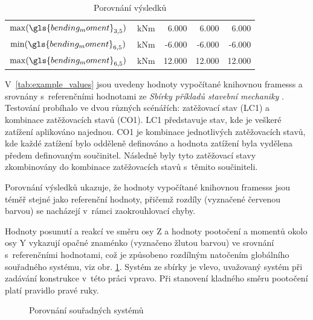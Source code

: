 \begin{table}[H]
\begin{tabular}{ccrrr}
            $\max(\gls{bending_moment}_{3,5})$ & $\SI{}{\kilo\newton\meter}$ & 6.000 & 6.000 & 6.000 \\
            $\min(\gls{bending_moment}_{6,5})$ & $\SI{}{\kilo\newton\meter}$ & -6.000 & -6.000 & -6.000 \\
            $\max(\gls{bending_moment}_{6,5})$ & $\SI{}{\kilo\newton\meter}$ & 12.000 & 12.000 & 12.000 
    \end{tabular}
    \caption{Porovnání výsledků}
    \label{tab:example_values}
\end{table}

V~\autoref{tab:example_values} jsou uvedeny hodnoty vypočítané knihovnou framesss a srovnány s~referenčními hodnotami ze \textit{Sbírky příkladů stavební mechaniky} \cite{sbirka_prikladu}. Testování probíhalo ve dvou různých scénářích: zatěžovací stav (LC1) a kombinace zatěžovacích stavů (CO1). LC1 představuje stav, kde je veškeré zatížení aplikováno najednou. CO1 je kombinace jednotlivých zatěžovacích stavů, kde každé zatížení bylo odděleně definováno a hodnota zatížení byla vydělena předem definovaným součinitel. Následně byly tyto zatěžovací stavy zkombinovány do kombinace zatěžovacích stavů s~těmito součiniteli.

Porovnání výsledků ukazuje, že hodnoty vypočítané knihovnou framesss jsou téměř stejné jako referenční hodnoty, přičemž rozdíly (vyznačené \colorbox{red!8}{červenou barvou}) se nacházejí v~rámci zaokrouhlovací chyby.

Hodnoty posunutí a reakcí ve směru osy \gls{Z} a hodnoty pootočení a momentů okolo osy \gls{Y} vykazují opačné znaménko (vyznačeno \colorbox{yellow!15}{žlutou barvou}) ve srovnání s~referenčními hodnotami, což je způsobeno rozdílným natočením globálního souřadného systému, viz obr. \ref{fig:example_coordinate_systems}. Systém ze sbírky je vlevo, uvažovaný systém při zadávání konstrukce v~této práci vpravo. Při stanovení kladného směru pootočení platí pravidlo pravé ruky.

\begin{figure}[H]
    
    \caption{Porovnání souřadných systémů}
    \label{fig:example_coordinate_systems}
\end{figure}

